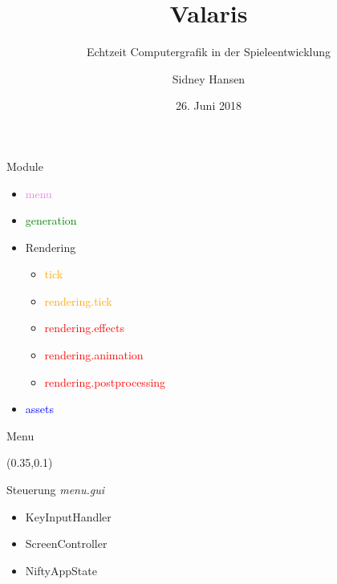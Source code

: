 \documentclass[10pt]{beamer}
\title{Valaris}
\subtitle{Echtzeit Computergrafik in der Spieleentwicklung}
\date{26. Juni 2018}
\author{Sidney Hansen}
\begin{document}
\maketitle

\begin{frame}[fragile]{Module}

    \begin{itemize}
        \item \textcolor{violet}{menu}
        \item \textcolor{green}{generation}
        \item Rendering
        \begin{itemize}
            \item \textcolor{orange}{tick}
            \item \textcolor{orange}{rendering.tick}
            \item \textcolor{red}{rendering.effects}
            \item \textcolor{red}{rendering.animation}
            \item \textcolor{red}{rendering.postprocessing}
        \end{itemize}
        \item \textcolor{blue}{assets}
    \end{itemize}

\end{frame}







\begin{frame}[fragile]{Menu}
 \setlength{\TPHorizModule}{\textwidth}
 \setlength{\TPVertModule}{\textwidth}

        \begin{textblock}{0.5}(0.35,0.1)
                \begin{block}{Steuerung}
                    \textit{menu.gui}
                    \begin{itemize}
                        \item KeyInputHandler
                        \item ScreenController
                        \item NiftyAppState
                    \end{itemize}
                \end{block}
        \end{textblock}
\end{frame}
\end{document}
